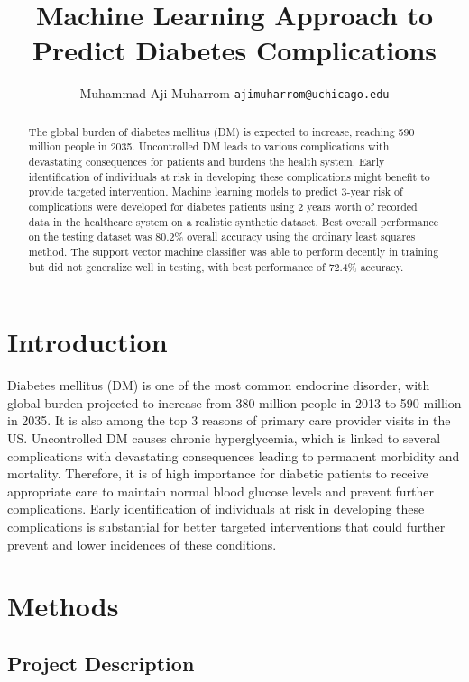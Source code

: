 \documentclass{article}
\title{Machine Learning Approach to Predict Diabetes Complications}
\author{%
  Muhammad Aji Muharrom %
  \texttt{ajimuharrom@uchicago.edu} \\
}
\begin{document}
\maketitle


\begin{abstract}
  The global burden of diabetes mellitus (DM) is expected to increase, reaching 590 million people in 2035. Uncontrolled DM leads to various complications with devastating consequences for patients and burdens the health system. Early identification of individuals at risk in developing these complications might benefit to provide targeted intervention. Machine learning models to predict 3-year risk of complications were developed for diabetes patients using 2 years worth of recorded data in the healthcare system on a realistic synthetic dataset. Best overall performance on the testing dataset was 80.2\% overall accuracy using the ordinary least squares method. The support vector machine classifier was able to perform decently in training but did not generalize well in testing, with best performance of 72.4\% accuracy. 
\end{abstract}


\section{Introduction}

Diabetes mellitus (DM) is one of the most common endocrine disorder, with global burden projected to increase from 380 million people in 2013 to 590 million in 2035.\cite{kavakiotis,ravaut21}  It is also among the top 3 reasons of primary care provider visits in the US.\cite{synthea} Uncontrolled DM causes chronic hyperglycemia, which is linked to several complications with devastating consequences leading to permanent morbidity and mortality. Therefore, it is of high importance for diabetic patients to receive appropriate care to maintain normal blood glucose levels and prevent further complications. Early identification of individuals at risk in developing these complications is substantial for better targeted interventions that could further prevent and lower incidences of these conditions.\cite{ravaut21}


\section{Methods}

\subsection{Project Description}
\end{document}
